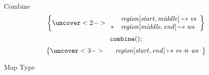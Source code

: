 \begin{frame}{Combine}
  $$\left\lbrace
    \uncover<2->{\begin{array}{cl}
      & \mathit{region}[\mathit{start}, \mathit{middle}] \mapsto \mathit{vs}\\
      \sepconj & \mathit{region}[\mathit{middle}, \mathit{end}] \mapsto \mathit{ws}
    \end{array}}
    \right\rbrace$$
  $${\bf{\mathtt{combine}}}();$$
  $$\left\lbrace
    \uncover<3->{\begin{array}{cl}
      & \mathit{region}[\mathit{start}, \mathit{end}] \mapsto \mathit{vs} \mathop{+\!\!\!+} \mathit{ws}
    \end{array}}
    \right\rbrace$$

\end{frame}


\begin{frame}{Map Type}
\end{frame}

